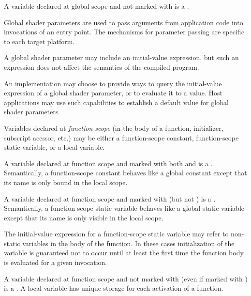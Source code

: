 
A variable declared at global scope and not marked with  is a .

Global shader parameters are used to pass arguments from application code into invocations of an entry point.
The mechanisms for parameter passing are specific to each target platform.

A global shader parameter may include an initial-value expression, but such an expression does not affect the semantics of the compiled program.

\begin{Note}
An implementation may choose to provide ways to query the initial-value expression of a global shader parameter, or to evaluate it to a value.
Host applications may use such capabilities to establish a default value for global shader parameters.
\end{Note}


Variables declared at \emph{function scope} (in the body of a function, initializer, subscript acessor, etc.) may be either a function-scope constant, function-scope static variable, or a local variable.


A variable declared at function scope and marked with both  and  is a .
Semantically, a function-scope constant behaves like a global constant except that its name is only bound in the local scope.


A variable declared at function scope and marked with  (but not ) is a .
Semantically, a function-scope static variable behaves like a global static variable except that its name is only visible in the local scope.

The initial-value expression for a function-scope static variable may refer to non-static variables in the body of the function.
In these cases initialization of the variable is guaranteed not to occur until at least the first time the function body is evaluated for a given invocation.


A variable declared at function scope and not marked with  (even if marked with ) is a .
A local variable has unique storage for each activation of a function.

